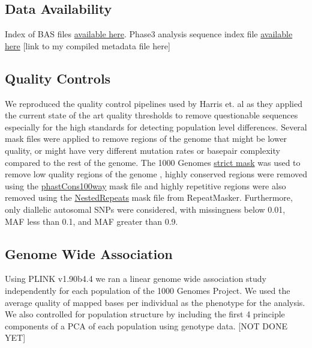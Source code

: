 \documentclass[12pt]{amsart}
\begin{document}
\subsection{Data Availability}

Index of BAS files \href{http://ftp.1000genomes.ebi.ac.uk/vol1/ftp/data_collections/1000_genomes_project/1000genomes.low_coverage.GRCh38DH.alignment.index}{available here}.
Phase3 analysis sequence index file  \href{http://ftp.1000genomes.ebi.ac.uk/vol1/ftp/phase3/20130502.phase3.analysis.sequence.index}{available here} 
[link to my compiled metadata file here]

\subsection{Quality Controls}
We reproduced the quality control pipelines used by Harris et. al as they applied the current state of the art quality thresholds to remove questionable sequences especially for the high standards for detecting population level differences. 
Several mask files were applied to remove regions of the genome that might be lower quality, or might have very different mutation rates or basepair complexity compared to the rest of the genome. 
The  1000 Genomes \href{http://ftp.1000genomes.ebi.ac.uk/vol1/ftp/release/20130502/supporting/accessible_genome_masks/20141020.strict_mask.whole_genome.bed}{strict mask} was used to remove low quality regions of the genome , highly conserved regions were removed using the \href{http://hgdownload.cse.ucsc.edu/goldenPath/hg19/database/phastConsElements100way.txt.gz}{phastCons100way} mask file and highly repetitive regions were also removed using the \href{http://hgdownload.cse.ucsc.edu/goldenpath/hg19/database/nestedRepeats.txt.gz}{NestedRepeats} mask file from RepeatMasker. 
Furthermore, only diallelic autosomal SNPs were considered, with missingness below 0.01, MAF less than 0.1, and MAF greater than 0.9.

\subsection{Genome Wide Association}

Using PLINK v1.90b4.4 we ran a linear genome wide association study independently for each population of the 1000 Genomes Project. We used the average quality of mapped bases per individual as the phenotype for the analysis. We also controlled for population structure by including the first 4 principle components of a PCA of each population using genotype data. [NOT DONE YET]
\end{document}
